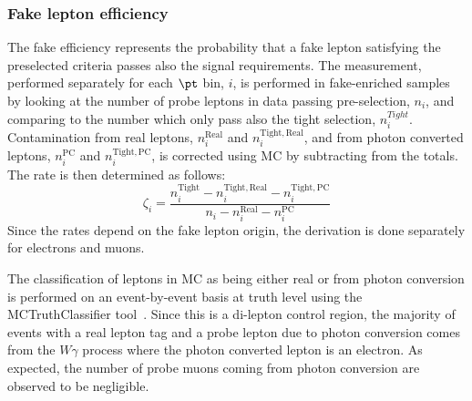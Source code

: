 \clearpage

\subsubsection{Fake lepton efficiency}

The fake efficiency represents the probability that a fake lepton satisfying the preselected criteria passes also the signal requirements. 
The measurement, performed separately for each $\pt$ bin, $i$, is performed in fake-enriched samples by looking at the number of probe leptons in data 
passing pre-selection, $n_i$, and comparing to the number which only pass also the tight
selection, $n^{Tight}_i$. Contamination from real leptons, $n^{\mathrm{Real}}_i$ and $n^{\mathrm{Tight}, \mathrm{Real}}_i$, 
and from photon converted leptons, $n^{\mathrm{PC}}_i$ and $n^{\mathrm{Tight},\mathrm{PC}}_i$, 
is corrected using MC by subtracting from the totals.  The rate is then determined as follows:
\begin{equation}
\zeta_i=\frac{n^{\mathrm{Tight}}_i-n^{\mathrm{Tight},\mathrm{Real}}_i-n^{\mathrm{Tight},\mathrm{PC}}_i} {n_i -n^{\mathrm{Real}}_i -n^{\mathrm{PC}}_i }
\label{eq:fakerate}
\end{equation}
Since the rates depend on the fake lepton origin, the derivation is done separately for electrons and muons.     

The classification of leptons in MC as being either real or from photon conversion is performed on an event-by-event basis at truth level using the MCTruthClassifier tool~\cite{MCtruthclassifier:twiki}.  
Since this is a di-lepton control region, the majority of events with a real lepton
tag and a probe lepton due to photon conversion comes from the $W\gamma$ process where the photon converted lepton is an electron.
As expected, the number of probe muons coming from photon conversion are observed to be negligible.

